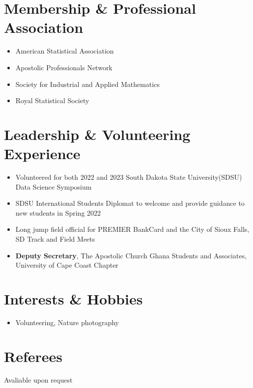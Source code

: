 \documentclass[letterpaper,11pt]{article}
\newcommand{\resumeItem}[2]{
  \item[]\normalsize{
    {#1}{ #2 \vspace{-2pt}}
  }
}
\newcommand{\resumeItemListStart}{\begin{itemize}[leftmargin=0pt]}
\newcommand{\resumeItemListEnd}{\end{itemize}\vspace{-5pt}}
\newcommand{\twocolumnbullets}[2]{
	\noindent %
	\begin{minipage}[t]{0.5\textwidth} %
		\begin{itemize}[leftmargin=*, itemsep=0pt, topsep=0pt, partopsep=0pt, parsep=0pt] %
			#1 %
		\end{itemize}
	\end{minipage}%
	\hfill %
	\begin{minipage}[t]{0.5\textwidth} %
		\begin{itemize}[itemsep=0pt, topsep=0pt, partopsep=0pt, parsep=0pt] %
			#2 %
		\end{itemize}
	\end{minipage}
}
\begin{document}
\section{Membership \& Professional Association}
\twocolumnbullets{
	\item American Statistical Association
	\item Apostolic Professionals Network
}
{
	\item Society for Industrial and Applied Mathematics
	\item Royal Statistical Society
}


\section{Leadership \& Volunteering Experience}
\resumeItemListStart
	\item Volunteered for both 2022 and 2023 South Dakota State University(SDSU) Data Science Symposium\vspace{-8pt}
	\item SDSU International Students Diplomat to welcome and provide guidance to new students in Spring 2022\vspace{-8pt}
	\item Long jump field official for PREMIER BankCard and the City of Sioux Falls, SD Track and Field Meets\vspace{-8pt}
		\item \textbf{Deputy Secretary}, The Apostolic Church Ghana Students and Associates, University of Cape Coast Chapter
\resumeItemListEnd

\section{Interests \& Hobbies}
  \resumeItemListStart
  	\resumeItem{Volunteering, Nature photography}{}
  \resumeItemListEnd
	
\section{Referees}
Avaliable upon request
\end{document}
